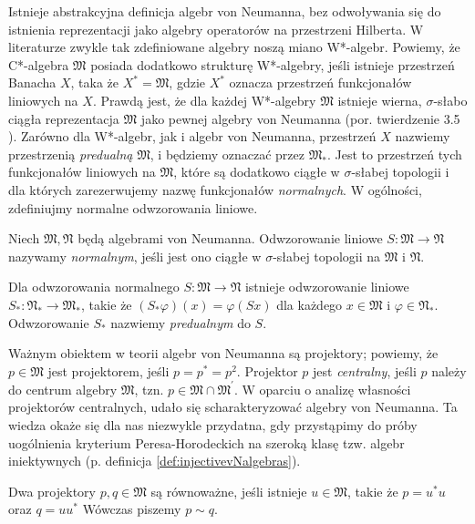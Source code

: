 Istnieje abstrakcyjna definicja algebr von Neumanna, bez odwoływania się
do istnienia reprezentacji jako algebry operatorów na przestrzeni Hilberta.
W literaturze zwykle tak zdefiniowane algebry noszą miano W*-algebr.
Powiemy, że C*-algebra $\mathfrak{M}$ posiada dodatkowo strukturę W*-algebry,
jeśli istnieje przestrzeń Banacha $X$, taka że
$X^{*} = \mathfrak{M}$,
gdzie $X^{*}$ oznacza przestrzeń funkcjonałów liniowych na $X$.
Prawdą jest, że dla każdej W*-algebry $\mathfrak{M}$ istnieje wierna,
$\sigma$-słabo ciągła reprezentacja $\mathfrak{M}$ jako pewnej algebry von Neumanna
(por. twierdzenie 3.5 \cite{Takesaki1}).
Zarówno dla W*-algebr, jak i algebr von Neumanna,
przestrzeń $X$ nazwiemy przestrzenią \emph{predualną} $\mathfrak{M}$,
i będziemy oznaczać przez $\mathfrak{M}_{*}$.
Jest to przestrzeń tych funkcjonałów liniowych na $\mathfrak{M}$, które
są dodatkowo ciągłe w $\sigma$-słabej topologii i dla których zarezerwujemy
nazwę funkcjonałów \emph{normalnych}.
W ogólności, zdefiniujmy normalne odwzorowania liniowe.
\begin{Definition}
    \label{def:normalMap}
    Niech $\mathfrak{M}, \mathfrak{N}$ będą algebrami von Neumanna.
    Odwzorowanie liniowe $S: \mathfrak{M} \rightarrow \mathfrak{N}$
    nazywamy \emph{normalnym}, jeśli
    jest ono ciągłe w $\sigma$-słabej topologii na $\mathfrak{M}$ i $\mathfrak{N}$.
\end{Definition}
Dla odwzorowania normalnego $S: \mathfrak{M} \rightarrow \mathfrak{N}$
istnieje odwzorowanie liniowe $S_{*}: \mathfrak{N}_{*} \rightarrow \mathfrak{M}_{*}$,
takie że $(S_{*} \varphi) (x) = \varphi(Sx)$ dla każdego
$x \in \mathfrak{M}$ i $\varphi \in \mathfrak{N}_*$.
Odwzorowanie $S_{*}$ nazwiemy \emph{predualnym} do $S$.

Ważnym obiektem w teorii algebr von Neumanna są projektory; powiemy, że
$p \in \mathfrak{M}$ jest projektorem, jeśli $p = p^{*} = p^{2}$.
Projektor $p$ jest \emph{centralny}, jeśli
$p$ należy do centrum algebry $\mathfrak{M}$, tzn.
$p \in \mathfrak{M} \cap \mathfrak{M}^{\prime}$.
W oparciu o analizę własności projektorów centralnych,
udało się scharakteryzować algebry von Neumanna.
Ta wiedza okaże się dla nas niezwykle przydatna, gdy przystąpimy do próby
uogólnienia kryterium Peresa-Horodeckich na szeroką klasę tzw. algebr iniektywnych
(p. definicja \ref{def:injectivevNalgebras}).

\begin{Definition}
Dwa projektory $p, q \in \mathfrak{M}$ są równoważne,
jeśli istnieje $u \in \mathfrak{M}$, takie że
$p = u^{*} u$ oraz $ q = u u^{*}$
Wówczas piszemy $p \sim q$.
\end{Definition}

